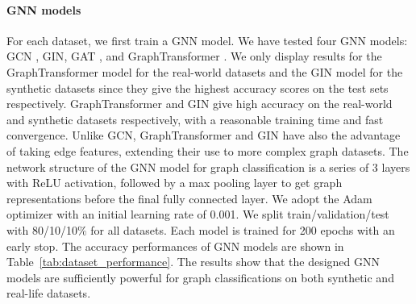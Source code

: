 
\begin{table}[ht]
\centering
{}
\caption{Dataset statistics and accuracy performance of the GNN model on the test set}\label{tab:dataset_performance}
\end{table}
\paragraph{GNN models}  For each dataset, we first train a GNN model. We have tested four GNN models: GCN \cite{GCN}, GIN\cite{GIN}, GAT \cite{GAT}, and GraphTransformer \cite{GraphTransf}. We only display results for the GraphTransformer model for the real-world datasets and the GIN model for the synthetic datasets since they give the highest accuracy scores on the test sets respectively. GraphTransformer and GIN give high accuracy on the real-world and synthetic datasets respectively, with a reasonable training time and fast convergence. Unlike GCN, GraphTransformer and GIN have also the advantage of taking edge features, extending their use to more complex graph datasets. The network structure of the GNN model for graph classification is a series of 3 layers with ReLU activation, followed by a max pooling layer to get graph representations before the final fully connected layer. We adopt the Adam optimizer with an initial learning rate of 0.001. We split train/validation/test with 80/10/10$\%$ for all datasets. Each model is trained for 200 epochs with an early stop. The accuracy performances of GNN models are shown in Table~\ref{tab:dataset_performance}. The results show that the designed GNN models are sufficiently powerful for graph classifications on both synthetic and real-life datasets.

